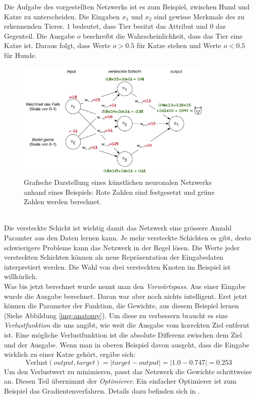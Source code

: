 Die Aufgabe des vorgestellten Netzwerks ist es zum Beispiel, zwischen Hund und Katze zu unterscheiden. Die Eingaben $x_1$ und $x_2$ sind gewisse Merkmale des zu erkennenden Tieres. $1$ bedeutet, dass Tier besitzt das Attribut und $0$ das Gegenteil. Die Ausgabe $o$ beschreibt die Wahrscheinlichkeit, dass das Tier eine Katze ist. Daraus folgt, dass Werte $o>0.5$ für Katze stehen und Werte $o<0.5$ für Hunde.
\begin{figure}[hbt]
	\centering
		\includegraphics[width=0.85\textwidth]{assets/neural_net.png}
	\caption{Grafische Darstellung eines künstlichen neuronalen Netzwerks anhand eines Beispiels: Rote Zahlen sind festgesetzt und grüne Zahlen werden berechnet.}
	\label{img:neuralnet}
\end{figure}
\\
Die versteckte Schicht ist wichtig damit das Netzwerk eine grössere Anzahl Paramter aus den Daten lernen kann. Je mehr versteckte Schichten es gibt, desto schwierigere Probleme kann das Netzwerk in der Regel lösen. Die Werte jeder versteckten Schichten können als neue Repräsentation der Eingabedaten interpretiert werden. Die Wahl von drei versteckten Knoten im Beispiel ist willkürlich.
\\
Was bis jetzt berechnet wurde nennt man den \textit{Vorwärtspass}. Aus einer Eingabe wurde die Ausgabe berechnet. Daran war aber noch nichts intelligent. Erst jetzt können die Parameter der Funktion, die Gewichte, aus diesem Beispiel lernen (Siehe Abbildung \ref{img:anatomy}). Um diese zu verbessern braucht es eine \textit{Verlustfunktion} die uns angibt, wie weit die Ausgabe vom korrekten Ziel entfernt ist. Eine mögliche Verlustfunktion ist die absolute Differenz zwischen dem Ziel und der Ausgabe. Wenn man in oberen Beispiel davon ausgeht, dass die Eingabe wirklich zu einer Katze gehört, ergäbe sich:
$$ \text{Verlust}(output, target) = |target-output| = |1.0-0.747| = 0.253$$
Um den Verlustwert zu minimieren, passt das Netzwerk die Gewichte schrittweise an. Diesen Teil übernimmt der  \textit{Optimierer}. Ein einfacher Optimierer ist zum Beispiel das Gradientenverfahren. Details dazu befinden sich in \parencite{gradient}.

